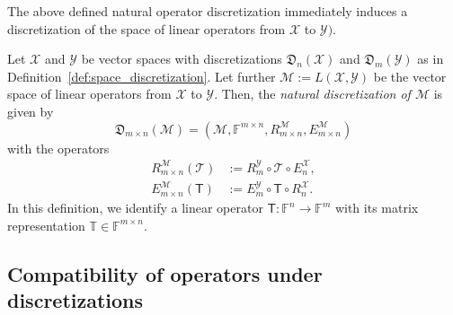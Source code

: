 \documentclass[a4paper]{paper}
\newcommand{\Discr}{\mathfrak{D}}
\newcommand{\VecSpace}[1]{\mathscr{#1}}
\newcommand{\Field}{\mathbb{F}}
\newcommand{\Op}[1]{\mathcal{#1}}
\newcommand{\DiscOp}[1]{\mathsf{#1}}
\newcommand*{\EXT}[2]{\ensuremath{E_{#1}^{#2}}}
\newcommand*{\REST}[2]{\ensuremath{R_{#1}^{#2}}}
\newcommand*{\RnX}{\ensuremath{\REST{n}{\VecSpace{X}}}}
\newcommand*{\RmY}{\ensuremath{\REST{m}{\VecSpace{Y}}}}
\newcommand*{\EnX}{\ensuremath{\EXT{n}{\VecSpace{X}}}}
\newcommand*{\EmY}{\ensuremath{\EXT{m}{\VecSpace{Y}}}}
\begin{document}
The above defined natural operator discretization immediately induces a discretization of the space of linear operators from $\VecSpace{X}$ 
to $\VecSpace{Y})$.

\begin{definition}
 \label{def:operator_space_discretization}
 Let $\VecSpace{X}$ and $\VecSpace{Y}$ be vector spaces with discretizations $\Discr_n(\VecSpace{X})$ and $\Discr_m(\VecSpace{Y})$ 
 as in Definition~\ref{def:space_discretization}. Let further $\VecSpace{M} := L(\VecSpace{X}, \VecSpace{Y})$ be the vector 
 space of linear operators from $\VecSpace{X}$ to $\VecSpace{Y}$. Then, the \emph{natural discretization of $\VecSpace{M}$} is given by
 \begin{equation*}
  \Discr_{m\times n}(\VecSpace{M}) = \left( \VecSpace{M}, \Field^{m\times n}, \REST{m\times n}{\VecSpace{M}}, \EXT{m\times n}{\VecSpace{M}}
  \right)
 \end{equation*}
 with the operators
 \begin{align*}
  \REST{m\times n}{\VecSpace{M}}(\Op{T}) &:= \RmY \circ \Op{T} \circ \EnX, \\
  \EXT{m\times n}{\VecSpace{M}}(\DiscOp{T}) &:= \EmY \circ \DiscOp{T} \circ \RnX.
 \end{align*}
 In this definition, we identify a linear operator $\DiscOp{T}\colon \Field^n \to \Field^m$ with its matrix representation
 $\mathbb{T} \in \Field^{m\times n}$.
\end{definition}



\subsection{Compatibility of operators under discretizations}
\end{document}
